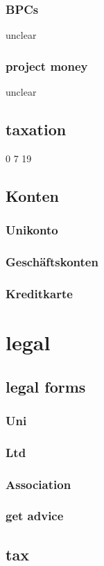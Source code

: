 \documentclass[output=guidelines,guidelines] {langscibook}
\begin{document}
\subsubsection{BPCs}
                    unclear
\subsubsection{project money}
                    unclear
\subsection{taxation}
                0
                7
                19
\subsection{Konten}
\subsubsection{Unikonto}
\subsubsection{Geschäftskonten}
\subsubsection{Kreditkarte}
\section{legal}
\subsection{legal forms}
\subsubsection{Uni}
\subsubsection{Ltd}
\subsubsection{Association}
\subsubsection{get advice}
\subsection{tax}
\end{document}
